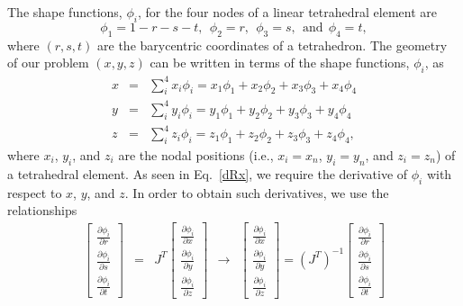 The shape functions, $\phi_i$, for the four nodes of a linear tetrahedral element are
%
\begin{equation}
\phi_1 = 1 - r - s - t, \ \ \phi_2 = r, \ \ \phi_3 = s, \ \ \text{and} \ \ \phi_4 = t,
\label{shape_fxns}
\end{equation}
%
where $(r,s,t)$ are the barycentric coordinates of a tetrahedron. The geometry of our problem $(x,y,z)$ can be written in terms of the shape functions, $\phi_i$, as
%
\begin{eqnarray}
x &=& \sum_{i}^4 x_i \phi_i = x_1 \phi_1 + x_2 \phi_2 + x_3 \phi_3 + x_4 \phi_4 \nonumber\\
y &=& \sum_i^4 y_i \phi_i =  y_1 \phi_1 + y_2 \phi_2 + y_3 \phi_3 + y_4 \phi_4  \nonumber\\
z &=& \sum_i^4  z_i \phi_i =  z_1 \phi_1 + z_2 \phi_2 + z_3 \phi_3 + z_4 \phi_4 ,
\label{geometry}
\end{eqnarray}
%
where $x_i$, $y_i$, and $z_i$ are the nodal positions (i.e., $x_i = x_n$, $y_i = y_n$, and $z_i = z_n$) of a tetrahedral element. As seen in Eq.\ \eqref{dRx}, we require the derivative of $\phi_i$ with respect to $x$, $y$, and $z$. In order to obtain such derivatives, we use the relationships
%
\begin{eqnarray}
%
\begin{bmatrix}
\frac{\partial \phi_i}{\partial r} \\
\frac{\partial \phi_i}{\partial s} \\
\frac{\partial \phi_i}{\partial t}
\end{bmatrix} &=&
%
J^T
%
\begin{bmatrix}
\frac{\partial \phi_i}{\partial x} \\
\frac{\partial \phi_i}{\partial y} \\
\frac{\partial \phi_i}{\partial z}
\end{bmatrix} \ \ \rightarrow \ \ 
%
%
\begin{bmatrix}
\frac{\partial \phi_i}{\partial x} \\
\frac{\partial \phi_i}{\partial y} \\
\frac{\partial \phi_i}{\partial z}
\end{bmatrix} =
%
(J^T)^{-1}
%
\begin{bmatrix}
\frac{\partial \phi_i}{\partial r} \\
\frac{\partial \phi_i}{\partial s} \\
\frac{\partial \phi_i}{\partial t}
\end{bmatrix}
\label{dx_to_dr}
\end{eqnarray}
